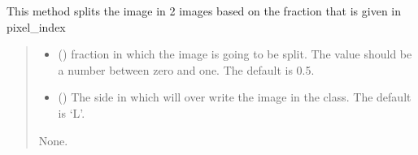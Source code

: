 \documentclass[letterpaper,10pt,english]{sphinxmanual}
\begin{document}

\begin{fulllineitems}
\label{\detokenize{forensicfit.utils.image_tools:forensicfit.utils.image_tools.split_v}}
\pysigstartsignatures
{}
\pysigstopsignatures
\sphinxAtStartPar
This method splits the image in 2 images based on the fraction that is
given in pixel\_index
\begin{quote}\begin{description}
\begin{itemize}
\item {} 
\sphinxAtStartPar
{} (\sphinxstyleliteralemphasis{\sphinxupquote{, }}) \textendash{} fraction in which the image is going to be split. The value should
be a number between zero and one. The default is 0.5.

\item {} 
\sphinxAtStartPar
{} (\sphinxstyleliteralemphasis{\sphinxupquote{, }}) \textendash{} The side in which will over write the image in the class. The
default is ‘L’.

\end{itemize}

\sphinxAtStartPar
None.

\end{description}\end{quote}

\end{fulllineitems}

\end{document}
